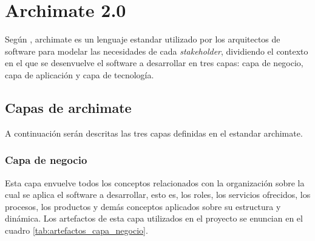 \section{Archimate 2.0}

Según  \cite{archimate2}, archimate es un lenguaje estandar utilizado por los arquitectos de software para modelar las necesidades de cada \textit{stakeholder}, dividiendo el contexto en el que se desenvuelve el software a desarrollar en tres capas: capa de negocio, capa de aplicación y capa de tecnología.

\subsection{Capas de archimate}

A continuación serán descritas las tres capas definidas en el estandar archimate.

\subsubsection{Capa de negocio}

Esta capa envuelve todos los conceptos relacionados con la organización sobre la cual se aplica el software a desarrollar, esto es, los roles, los servicios ofrecidos, los procesos, los productos y demás conceptos aplicados sobre su estructura y dinámica. Los artefactos de esta capa utilizados en el proyecto se enuncian en el cuadro \ref{tab:artefactos_capa_negocio}.

